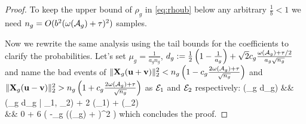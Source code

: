 \begin{proof}
	To keep the upper bound of $\rho_g$ in \eqref{eq:rhoub} below any arbitrary $\frac{1}{b} < 1$  we need $n_g = O(b^2(\omega({\cal A}_g) + \tau)^2)$ samples.%
	
	Now we rewrite the same analysis using the tail bounds for the coefficients to clarify the probabilities. 
	Let's set $\mu_g = \frac{1}{a_g n_g}$, $d_g := \frac{1}{2}\left(1 - \frac{1}{a_g} \right) + \sqrt{2} c_g\frac{\omega({\cal A}_g) + \tau/2}{a_g \sqrt{n_g}}$ and name the bad events of $\|\mathbf{X}_g(\mathbf{u} + \mathbf{v})\|_{2}^2 < n_g \left(1 -  c_g\frac{2 \omega({\cal A}_g) + \tau}{\sqrt{n_g}}\right) $ and $\|\mathbf{X}_g(\mathbf{u} - \mathbf{v})\|_{2}^2 > n_g \left(1 +  c_g\frac{2 \omega({\cal A}_g) + \tau}{\sqrt{n_g}}\right)$ as ${\cal E}_1$ and ${\cal E}_2$ respectively:
	\be 
	\nr 
	\pr(\rho_g \geq d_g) 
	&\leq& \pr(\rho_g \geq d_g | \neg\cE_1, \neg\cE_2) + 2 \pr(\cE_1) + \pr(\cE_2)  
	\\ \nr 
	 &\leq& 0 + 6 \exp\left( -\gamma_g (\omega(\cA_g) + \tau)^2  \right)
	\ee
	which concludes the proof. 	
\end{proof}
		 


